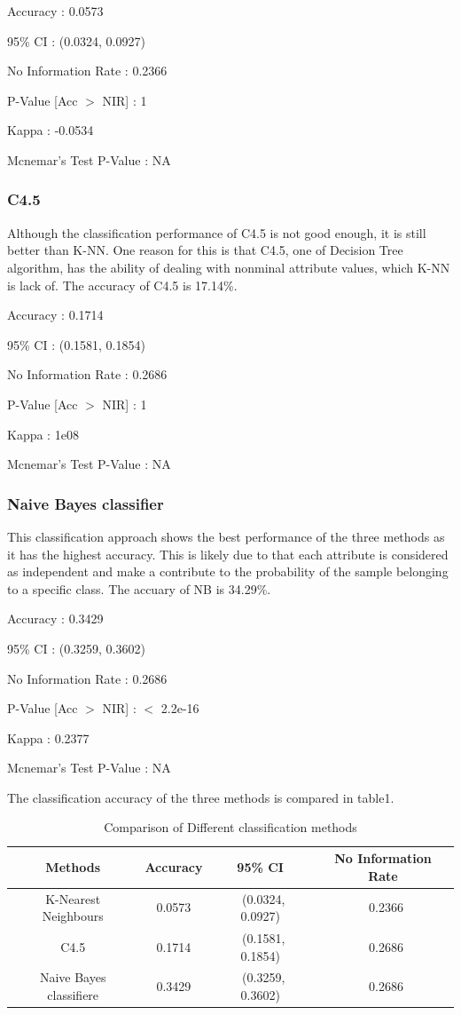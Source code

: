 \documentclass[conference]{IEEEtran}
\begin{document}
Accuracy : 0.0573

95\% CI : (0.0324, 0.0927)

No Information Rate : 0.2366

P-­Value [Acc $>$ NIR] : 1

Kappa : -0.0534

Mcnemar's Test P­-Value : NA 

\subsubsection{C4.5}
Although the classification performance of C4.5 is not good enough, it is still better than K-NN. One reason for this is that C4.5, one of Decision Tree algorithm, has the ability of dealing with nonminal attribute values, which K-NN is lack of. The accuracy of C4.5 is 17.14\%.

Accuracy : 0.1714

95\% CI : (0.1581, 0.1854)

No Information Rate : 0.2686

P-­Value [Acc $>$ NIR] : 1 

Kappa : 1e­08

Mcnemar's Test P-­Value : NA

\subsubsection{Naive Bayes classifier}
This classification approach shows the best performance of the three methods as it has the highest accuracy. This is likely due to that each attribute is considered as independent and make a contribute to the probability of the sample belonging to a specific class. The accuary of NB is 34.29\%.

Accuracy : 0.3429

95\% CI : (0.3259, 0.3602)

No Information Rate : 0.2686 

P­-Value [Acc $>$ NIR] : $<$ 2.2e-16

Kappa : 0.2377

Mcnemar's Test P­-Value : NA

The classification accuracy of the three methods is compared in table1.
\begin{table}
	\caption{Comparison of Different classification methods}

		\begin{tabular}{cccc}
			\hline
			\rule{0pt}{12pt}Methods  & \rule{0pt}{12pt}Accuracy  & \rule{0pt}{12pt}95\% CI   &\rule{0pt}{12pt} No Information Rate\\
			\hline\rule{0pt}{12pt}
			K-Nearest Neighbours    &   0.0573 & \ (0.0324, 0.0927)	 & \ 0.2366 \\
			C4.5   &  0.1714  & \ 	 (0.1581, 0.1854) & \ 0.2686 \\
		   Naive Bayes classifiere   &   0.3429 & \ (0.3259, 0.3602) & \ 0.2686 \\
			\hline
		\end{tabular}

\end{table}
\end{document}

